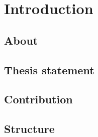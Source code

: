 \chapter{Introduction}
\label{c:intro}

\section{About}


\section{Thesis statement}
\label{c:intro:thesisstatement}


\section{Contribution}


\section{Structure}
